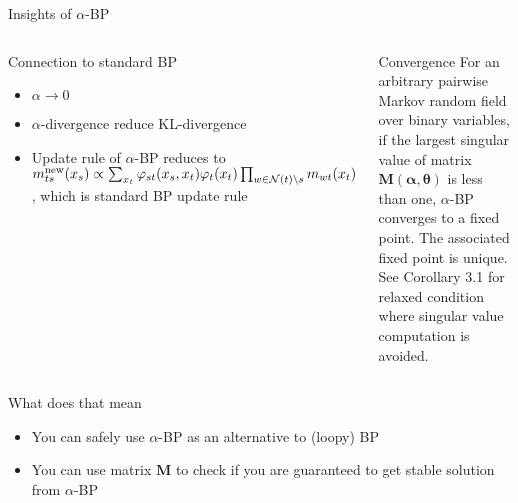 \begin{frame}{Insights of $\alpha$-BP}
  \begin{columns}
    \begin{block}{\small Connection to standard BP}
      \begin{itemize}[label=$\bullet$]
      \item $\alpha \rightarrow 0$ 
      \item $\alpha$-divergence reduce KL-divergence
      \item Update rule of $\alpha$-BP reduces to ${m}^{\text{new}}_{ts}(x_s) \propto \sum_{x_t} \varphi_{st}(x_s, x_t) {\varphi}_t(x_t) \prod_{w\in \mathcal{N}(t)\backslash s}m_{wt}(x_t)$, which is standard BP update rule
        
      \end{itemize}
    \end{block}
    \begin{block}{\small Convergence}
      For an arbitrary pairwise Markov random field over binary variables,
      if the largest singular value of matrix $\bm{M}(\bm{\alpha}, \bm{\theta})$ is less than one,
      $\alpha$-BP converges to a fixed point. The associated fixed point is unique.
      \vfill
      {\tiny See Corollary 3.1 for relaxed condition where singular value computation is avoided.}
    \end{block}
  \end{columns}
  \vskip 0.5cm
  \begin{block}{\small What does that mean}
    \begin{itemize}[label=$\bullet$]
    \item You can safely use $\alpha$-BP as an alternative to (loopy) BP
    \item You can use matrix $\bm{M}$ to check if you are guaranteed to get stable solution from $\alpha$-BP
    \end{itemize}
  \end{block}
  \let\thefootnote\relax{}
\end{frame}

